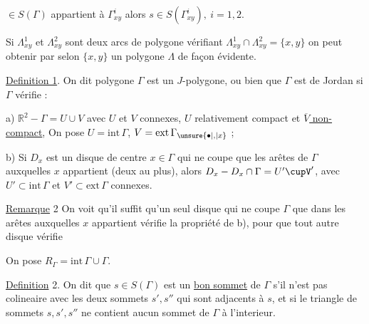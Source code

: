 $\in S(\Gamma)$ appartient à $\Gamma^{i}_{xy}$ alors $s\in S(\Gamma^{i}_{xy}),\ i=1,2$.

Si $\Lambda^{1}_{xy}$ et $\Lambda^{2}_{xy}$ sont deux arcs de polygone vérifiant \margin{$\bullet$}$\Lambda^{1}_{xy}\cap\Lambda^{2}_{xy}=\{x,y\}$ on peut obtenir par  selon $\{x,y\}$ un polygone $\Lambda$ de façon évidente.

%
\margin{$\bullet$}\uline{Definition 1}. On dit  polygone $\Gamma$ est un $J$-polygone, ou bien que $\Gamma$ est de Jordan si $\Gamma$ vérifie :

a) $\mathbb{R}^{2}-\Gamma=U\cup V$ avec $U$ et $V$ connexes, $U$ relativement compact et \uline{$\overline{V}$ non-compact}, On pose $U=\mathrm{int}\,\Gamma$, $V=\mathrm{ext}\,\Gamma_{\unsure{\bullet|,|x}}$ ;

b) Si $D_{x}$ est un disque de centre $x\in\Gamma$ qui ne coupe que les arêtes de $\Gamma$ auxquelles $x$ appartient (deux au plus), alors $D_{x}-D_{x}\cap\Gamma=U'\cupV'$, avec $U'\subset\mathrm{int}\,\Gamma$ et $V'\subset\mathrm{ext}\,\Gamma$ connexes.

%
\uline{Remarque} 2 On voit qu'il suffit qu'un seul disque  qui ne coupe $\Gamma$  que dans les  arêtes auxquelles $x$ appartient vérifie la propriété de b), pour que tout autre  disque  vérifie 

On pose $R_{\Gamma}=\mathrm{int}\,\Gamma\cup\Gamma$.

\margin{$\cdot$}\uline{Definition} 2. On dit que $s\in S(\Gamma)$ est un \uline{bon sommet} de $\Gamma$ s'il \margin{,}n'est pas colineaire avec les deux sommets $s',s''$ qui sont adjacents à $s$, et si le triangle de sommets $s,s',s''$ ne contient aucun sommet de $\Gamma$ à l'interieur. 

